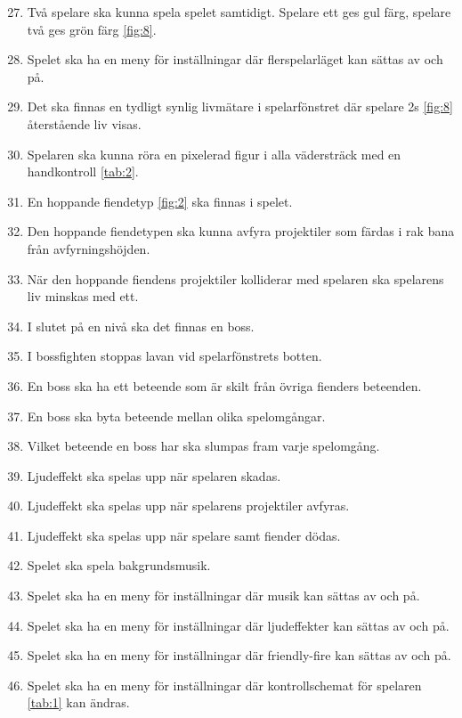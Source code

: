 \documentclass{TDP005mall}
\begin{document}
\begin{enumerate}
\setcounter{enumi}{26}
\item Två spelare ska kunna spela spelet samtidigt. Spelare ett ges gul färg, spelare två ges grön färg \ref{fig:8}.
\item Spelet ska ha en meny för inställningar där flerspelarläget kan sättas av och på.
\item Det ska finnas en tydligt synlig livmätare i spelarfönstret där spelare 2s \ref{fig:8} återstående liv visas.
\item Spelaren ska kunna röra en pixelerad figur i alla vädersträck med en handkontroll \ref{tab:2}.
\item En hoppande fiendetyp \ref{fig:2} ska finnas i spelet.
\item Den hoppande fiendetypen ska kunna avfyra projektiler som färdas i rak bana från avfyrningshöjden.
\item När den hoppande fiendens projektiler kolliderar med spelaren ska spelarens liv minskas med ett.
\item I slutet på en nivå ska det finnas en boss.
\item I bossfighten stoppas lavan vid spelarfönstrets botten.
\item En boss ska ha ett beteende som är skilt från övriga fienders beteenden.
\item En boss ska byta beteende mellan olika spelomgångar.
\item Vilket beteende en boss har ska slumpas fram varje spelomgång.
\item Ljudeffekt ska spelas upp när spelaren skadas.
\item Ljudeffekt ska spelas upp när spelarens projektiler avfyras.
\item Ljudeffekt ska spelas upp när spelare samt fiender dödas.
\item Spelet ska spela bakgrundsmusik.
\item Spelet ska ha en meny för inställningar där musik kan sättas av och på.
\item Spelet ska ha en meny för inställningar där ljudeffekter kan sättas av och på.
\item Spelet ska ha en meny för inställningar där friendly-fire kan sättas av och på.
\item Spelet ska ha en meny för inställningar där kontrollschemat för spelaren \ref{tab:1} kan ändras.
\end{enumerate}
\end{document}
